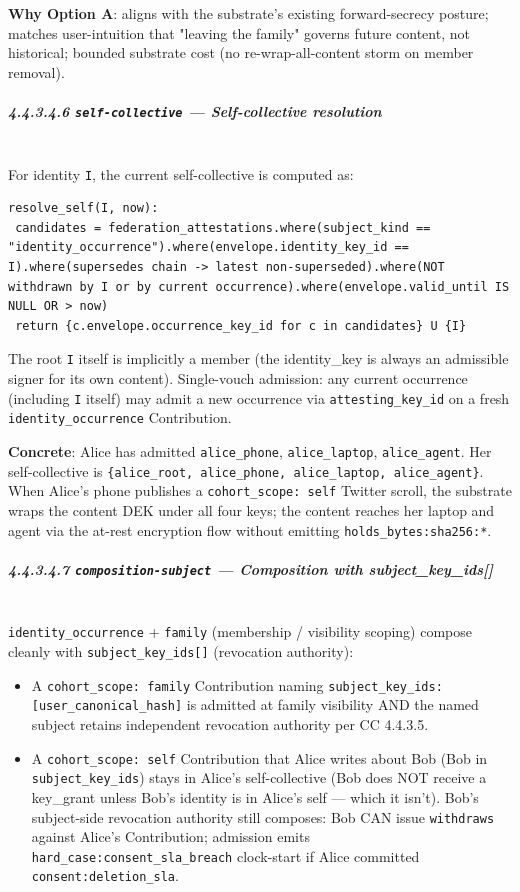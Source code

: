 \documentclass[11pt]{article}
\begin{document}
\textbf{Why Option A}: aligns with the substrate's existing forward-secrecy posture; matches user-intuition that "leaving the family" governs future content, not historical; bounded substrate cost (no re-wrap-all-content storm on member removal).


\subparagraph{4.4.3.4.6 \texttt{self-collective} — Self-collective resolution}\mbox{}\\


For identity \texttt{I}, the current self-collective is computed as:


\begin{lstlisting}
resolve_self(I, now):
 candidates = federation_attestations.where(subject_kind == "identity_occurrence").where(envelope.identity_key_id == I).where(supersedes chain -> latest non-superseded).where(NOT withdrawn by I or by current occurrence).where(envelope.valid_until IS NULL OR > now)
 return {c.envelope.occurrence_key_id for c in candidates} U {I}
\end{lstlisting}

The root \texttt{I} itself is implicitly a member (the identity\_key is always an admissible signer for its own content). Single-vouch admission: any current occurrence (including \texttt{I} itself) may admit a new occurrence via \texttt{attesting\_key\_id} on a fresh \texttt{identity\_occurrence} Contribution.


\textbf{Concrete}: Alice has admitted \texttt{alice\_phone}, \texttt{alice\_laptop}, \texttt{alice\_agent}. Her self-collective is \texttt{\{alice\_root, alice\_phone, alice\_laptop, alice\_agent\}}. When Alice's phone publishes a \texttt{cohort\_scope: self} Twitter scroll, the substrate wraps the content DEK under all four keys; the content reaches her laptop and agent via the at-rest encryption flow without emitting \texttt{holds\_bytes:sha256:*}.


\subparagraph{4.4.3.4.7 \texttt{composition-subject} — Composition with subject\_key\_ids[]}\mbox{}\\


\texttt{identity\_occurrence} + \texttt{family} (membership / visibility scoping) compose cleanly with \texttt{subject\_key\_ids[]} (revocation authority):


\begin{itemize}\setlength\itemsep{0pt}
\item A \texttt{cohort\_scope: family} Contribution naming \texttt{subject\_key\_ids: [user\_canonical\_hash]} is admitted at family visibility AND the named subject retains independent revocation authority per CC 4.4.3.5.
\item A \texttt{cohort\_scope: self} Contribution that Alice writes about Bob (Bob in \texttt{subject\_key\_ids}) stays in Alice's self-collective (Bob does NOT receive a key\_grant unless Bob's identity is in Alice's self — which it isn't). Bob's subject-side revocation authority still composes: Bob CAN issue \texttt{withdraws} against Alice's Contribution; admission emits \texttt{hard\_case:consent\_sla\_breach} clock-start if Alice committed \texttt{consent:deletion\_sla}.
\end{itemize}
\end{document}
